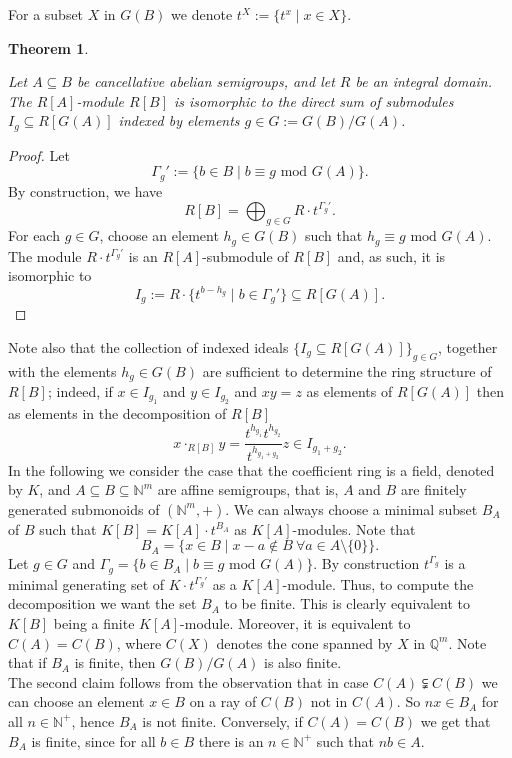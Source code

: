 \documentclass[11pt,a4paper]{amsart}%
\newtheorem{theorem}{Theorem}[section]
\theoremstyle{definition}
\theoremstyle{remark}
\numberwithin{equation}{section}
\theoremstyle{plain}
\begin{document}
For a subset $X$ in $G(B)$ we denote $t^X:=\{t^x\mid x\in X\}$.


\begin{theorem}\label{decomposition} 

Let $A\subseteq B$ be cancellative abelian semigroups, and let $R$ be an integral domain. The $R[A]$-module $R[B]$ is isomorphic to the direct sum of submodules $I_{g}\subseteq R[G(A)]$ indexed by elements $g\in G:= G(B)/G(A)$.

\end{theorem}
\begin{proof}
Let
\[
\Gamma_{g}':=\{b\in B\mid b\equiv g\text{ mod }G(A)\}.
\]
By construction, we have
\[
R[B]=\bigoplus_{g\in G} R\cdot t^{\Gamma_{g}'}.
\]
For each $g\in G$, choose an element $h_{g}\in G(B)$ such that $h_g\equiv g\text{ mod }G(A)$. The module $R\cdot t^{\Gamma_{g}'}$ is an $R[A]$-submodule of $R[B]$ and, as such, it is isomorphic to
\[
I_{g}:=R\cdot\{t^{b-h_{g}}\mid b\in\Gamma_{g}'\}\subseteq R[G(A)]\text{.}
\]
\end{proof}


Note also that the collection of indexed ideals $\{I_{g}\subseteq
R[G(A)]\}_{g\in G}$, together with the elements $h_{g}\in G(B)$ are sufficient
to determine the ring structure of $R[B]$; indeed, if $x\in I_{g_{1}}$ and
$y\in I_{g_{2}}$ and $xy=z$ as elements of $R[G(A)]$ then as elements in the
decomposition of $R[B]$%
\[
x\cdot_{R[B]}y=\frac{t^{h_{g_{1}}}t^{h_{g_{2}}}}{t^{h_{g_{1}+g_{2}}}}z\in I_{g_{1}+g_{2}}.
\]
In the following we consider the case that the coefficient ring is a field, denoted by $K$, and $A\subseteq B\subseteq \mathbb N^m$ are affine semigroups, that is, $A$ and $B$ are finitely generated submonoids of $(\mathbb N^m,+)$. We can always choose a minimal subset $B_A$ of $B$ such that $K[B]=K[A]\cdot t^{B_A}$ as $K[A]$-modules. Note that
$$
B_A=\{x\in B\mid x-a \notin B~\forall a\in A\setminus\{0\}\}.
$$
Let $g\in G$ and $\Gamma_g=\{b\in B_A \mid b\equiv g\text{ mod }G(A)\}$. By construction $t^{\Gamma_g}$ is a minimal generating set of $K\cdot t^{\Gamma_{g}'}$ as a $K[A]$-module. Thus, to compute the decomposition we want the set $B_A$ to be finite. This is clearly equivalent to $K[B]$ being a finite $K[A]$-module. Moreover, it is equivalent to $C(A)=C(B)$, where $C(X)$ denotes the cone spanned by $X$ in $\mathbb Q^m$. Note that if $B_A$ is finite, then $G(B)/G(A)$ is also finite.\\ 

The second claim follows from the observation that in case $C(A)\subsetneqq C(B)$ we can choose an element $x\in B$ on a ray of $C(B)$ not in $C(A)$. So $nx\in B_A$ for all $n\in\mathbb N^+$, hence $B_A$ is not finite. Conversely, if $C(A)=C(B)$ we get that $B_A$ is finite, since for all $b\in B$ there is an $n\in\mathbb N^+$ such that $nb\in A$.\\ 
\end{document}
